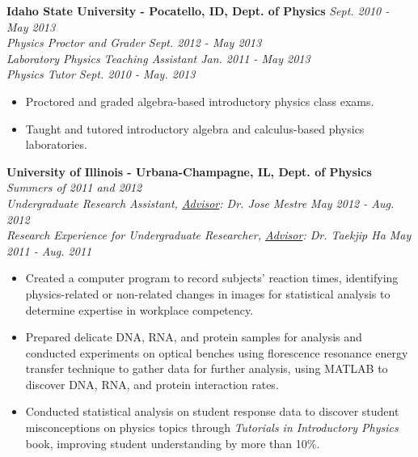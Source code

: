 \workspace
    \textbf{Idaho State University - Pocatello, ID, Dept. of Physics} \hfill \textit{Sept. 2010 - May 2013}\\
    \textit{Physics Proctor and Grader \hfill Sept. 2012 - May 2013}\\
    \textit{Laboratory Physics Teaching Assistant \hfill Jan. 2011 - May 2013}\\
    \textit{Physics Tutor \hfill Sept. 2010 - May. 2013}
    \begin{itemize}
        \item Proctored and graded algebra-based introductory physics class exams.
        \item Taught and tutored introductory algebra and calculus-based physics laboratories.
    \end{itemize}
    
\workspace
\newpage
    \textbf{University of Illinois - Urbana-Champagne, IL, Dept. of Physics} \hfill \textit{Summers of 2011 and 2012}\\
    \textit{Undergraduate Research Assistant, \underline{Advisor}: Dr. Jose Mestre \hfill May 2012 - Aug. 2012}\\
    \textit{Research Experience for Undergraduate Researcher, \underline{Advisor}: Dr. Taekjip Ha \hfill May 2011 - Aug. 2011}
    \begin{itemize}
        \item Created a computer program to record subjects' reaction times, identifying physics-related or non-related changes in images for statistical analysis to determine expertise in workplace competency.
        \item Prepared delicate DNA, RNA, and protein samples for analysis and conducted experiments on optical benches using florescence resonance energy transfer technique to gather data for further analysis, using MATLAB to discover DNA, RNA, and protein interaction rates.
    \end{itemize}

\workspace
    {
    \begin{itemize}
    \item Conducted statistical analysis on student response data to discover student misconceptions on physics topics through \textit{Tutorials in Introductory Physics} book, improving student understanding by more than 10\%.
    \end{itemize}
    }

